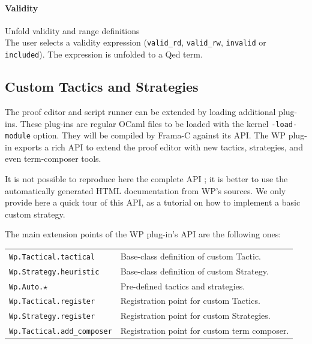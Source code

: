 \paragraph{Validity} Unfold validity and range definitions\\
The user selects a validity expression (\lstinline{valid_rd},
\lstinline{valid_rw}, \lstinline{invalid} or \lstinline{included}).
The expression is unfolded to a \textsf{Qed} term.


\subsection{Custom Tactics and Strategies}
\label{wp-custom-tactics}

The proof editor and script runner can be extended by loading additional plug-ins. These plug-ins are regular OCaml files to be loaded with the kernel \texttt{-load-module} option. They will be compiled by \textsf{Frama-C} against its API. The \textsf{WP} plug-in exports a rich API to extend the proof editor with new tactics, strategies, and even term-composer tools.

It is not possible to reproduce here the complete API ; it is better to use the automatically generated HTML documentation from \textsf{WP}'s sources. We only provide here a quick tour of this API, as a tutorial on how to implement a basic custom strategy.

The main extension points of the \textsf{WP} plug-in's API are the following ones:
\begin{center}
    \begin{tabular}{ll}
    \hline
    \texttt{Wp.Tactical.tactical} & Base-class definition of custom Tactic. \\
    \texttt{Wp.Strategy.heuristic} & Base-class definition of custom Strategy. \\
    \hline
    \texttt{Wp.Auto.$\star$} & Pre-defined tactics and strategies. \\
    \texttt{Wp.Tactical.register} & Registration point for custom Tactics. \\
    \texttt{Wp.Strategy.register} & Registration point for custom Strategies. \\
    \texttt{Wp.Tactical.add\_composer} & Registration point for custom term composer. \\
    \hline
    \end{tabular}
\end{center}

